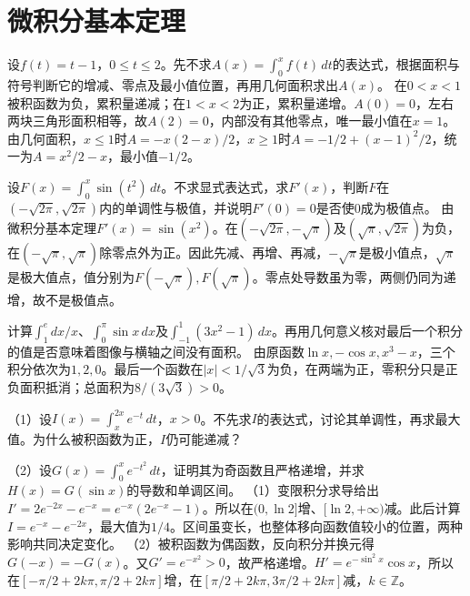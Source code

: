 \par\addvspace{12pt}

\section{微积分基本定理}

设\(f(t)=t-1\)，\(0\le t\le2\)。先不求\(A(x)=\int_0^x f(t)\,dt\)的表达式，根据面积与符号判断它的增减、零点及最小值位置，再用几何面积求出\(A(x)\)。
\solutionanswer
在\(0<x<1\)被积函数为负，累积量递减；在\(1<x<2\)为正，累积量递增。\(A(0)=0\)，左右两块三角形面积相等，故\(A(2)=0\)，内部没有其他零点，唯一最小值在\(x=1\)。由几何面积，\(x\le1\)时\(A=-x(2-x)/2\)，\(x\ge1\)时\(A=-1/2+(x-1)^2/2\)，统一为\(A=x^2/2-x\)，最小值\(-1/2\)。


设\(F(x)=\int_0^x\sin(t^2)\,dt\)。不求显式表达式，求\(F'(x)\)，判断\(F\)在\((-\sqrt{2\pi},\sqrt{2\pi})\)内的单调性与极值，并说明\(F'(0)=0\)是否使\(0\)成为极值点。
\solutionanswer
由微积分基本定理\(F'(x)=\sin(x^2)\)。在\((-\sqrt{2\pi},-\sqrt\pi)\)及\((\sqrt\pi,\sqrt{2\pi})\)为负，在\((-\sqrt\pi,\sqrt\pi)\)除零点外为正。因此先减、再增、再减，\(-\sqrt\pi\)是极小值点，\(\sqrt\pi\)是极大值点，值分别为\(F(-\sqrt\pi),F(\sqrt\pi)\)。零点处导数虽为零，两侧仍同为递增，故不是极值点。


计算\(\int_1^e dx/x\)、\(\int_0^\pi\sin x\,dx\)及\(\int_{-1}^1(3x^2-1)\,dx\)。再用几何意义核对最后一个积分的值是否意味着图像与横轴之间没有面积。
\solutionanswer
由原函数\(\ln x,-\cos x,x^3-x\)，三个积分依次为\(1,2,0\)。最后一个函数在\(|x|<1/\sqrt3\)为负，在两端为正，零积分只是正负面积抵消；总面积为\(8/(3\sqrt3)>0\)。


（1）设\(I(x)=\int_x^{2x}e^{-t}\,dt\)，\(x>0\)。不先求\(I\)的表达式，讨论其单调性，再求最大值。为什么被积函数为正，\(I\)仍可能递减？

（2）设\(G(x)=\int_0^x e^{-t^2}\,dt\)，证明其为奇函数且严格递增，并求\(H(x)=G(\sin x)\)的导数和单调区间。
\solutionanswer
（1）变限积分求导给出\(I'=2e^{-2x}-e^{-x}=e^{-x}(2e^{-x}-1)\)。所以在\((0,\ln2]\)增、\([\ln2,+\infty)\)减。此后计算\(I=e^{-x}-e^{-2x}\)，最大值为\(1/4\)。区间虽变长，也整体移向函数值较小的位置，两种影响共同决定变化。
（2）被积函数为偶函数，反向积分并换元得\(G(-x)=-G(x)\)。又\(G'=e^{-x^2}>0\)，故严格递增。\(H'=e^{-\sin^2x}\cos x\)，所以在\([-\pi/2+2k\pi,\pi/2+2k\pi]\)增，在\([\pi/2+2k\pi,3\pi/2+2k\pi]\)减，\(k\in\mathbb Z\)。


